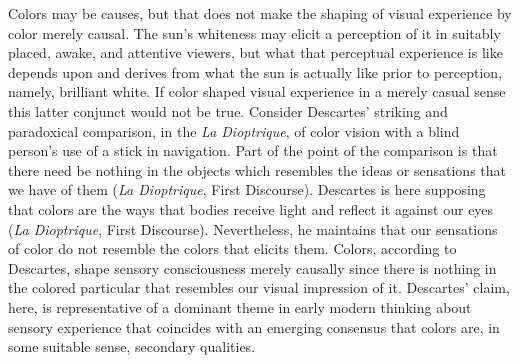 Colors may be causes, but that does not make the shaping of visual experience by color merely causal. The sun's whiteness may elicit a perception of it in suitably placed, awake, and attentive viewers, but what that perceptual experience is like depends upon and derives from what the sun is actually like prior to perception, namely, brilliant white. If color shaped visual experience in a merely casual sense this latter conjunct would not be true. Consider Descartes' striking and paradoxical comparison, in the \emph{La Dioptrique}, of color vision with a blind person's use of a stick in navigation. Part of the point of the comparison is that there need be nothing in the objects which resembles the ideas or sensations that we have of them (\emph{La Dioptrique}, First Discourse). Descartes is here supposing that colors are the ways that bodies receive light and reflect it against our eyes (\emph{La Dioptrique}, First Discourse). Nevertheless, he maintains that our sensations of color do not resemble the colors that elicits them. Colors, according to Descartes, shape sensory consciousness merely causally since there is nothing in the colored particular that resembles our visual impression of it. Descartes' claim, here, is representative of a dominant theme in early modern thinking about sensory experience that coincides with an emerging consensus that colors are, in some suitable sense, secondary qualities.



